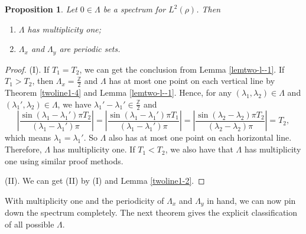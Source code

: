 \documentclass[12pt,a4paper,intlimits,sumlimits]{amsart}
\theoremstyle{plain}
\newtheorem{proposition}{Proposition}
\theoremstyle{definition}
\newcommand{\Abs}[1]{{\left|{#1}\right|}}
\newcommand{\ZZ}{{\mathbb Z}}
\newcounter{rem}
\begin{document}
\begin{proposition}\label{lemtwo-l--1-2} 
Let $0\in\Lambda$  be  a spectrum for $L^2(\rho)$. Then \begin{enumerate}
\item [(I)] $\Lambda$  has multiplicity one;
\item [(II)] $\Lambda_x$ and $\Lambda_y$ are  periodic sets.
\end{enumerate}
\end{proposition}
\begin{proof}
(I). If $T_1=T_2$, we can get the conclusion from Lemma \ref{lemtwo-l--1}. If  $T_1>T_2$, then  $\Lambda_x=   \frac{\mathbb{Z}}{2}$ and $\Lambda$ has at most one point on each vertical line  by Theorem \ref{twoline1-4} and Lemma \ref{lemtwo-l--1}.
 Hence, for any $(\lambda_1, \lambda_2)\in\Lambda$ and $(\lambda_1', \lambda_2)\in\Lambda$, we have  $\lambda_1'-\lambda_1'\in\frac{\ZZ}{2}$ and
 $$
\Abs{\frac{\sin (\lambda_1 - \lambda_1')\pi  T_2 }{ (\lambda_1 - \lambda_1')\pi  }}=\Abs{\frac{\sin (\lambda_1 - \lambda_1')\pi  T_1 }{ (\lambda_1 - \lambda_1')\pi  }} = \Abs{\frac{\sin (\lambda_2 - \lambda_2)\pi T_2 }{  (\lambda_2 - \lambda_2)\pi}}=T_2,$$
which means  $ \lambda_1= \lambda_1'$. So $\Lambda$ also has at most one point on each horizontal line. Therefore,  $\Lambda$  has multiplicity one. If  $T_1<T_2$,  we also have that $\Lambda$  has multiplicity one using similar proof methods.

(II). We can get (II) by (I) and Lemma \ref{twoline1-2}.

 \end{proof}


  With multiplicity one and the periodicity of 
 $\Lambda_x$ and 
 $\Lambda_y$	 in hand, we can now pin down the spectrum completely. The next theorem gives the explicit classification of all possible  $\Lambda$.
  
\end{document}
